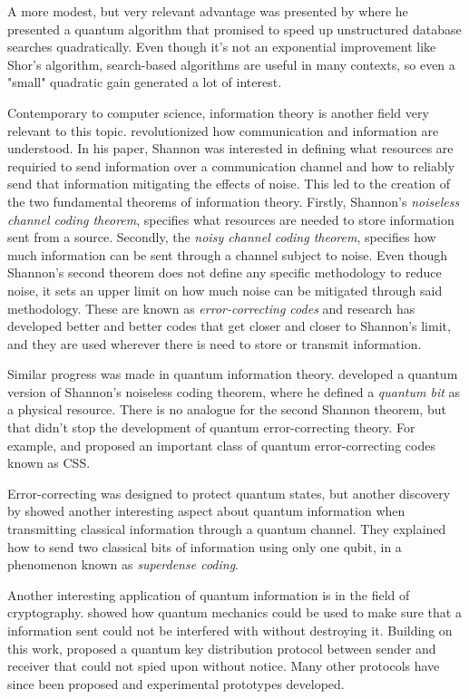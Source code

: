 \documentclass[../../dissertation.tex]{subfiles}
\begin{document}
A more modest, but very relevant advantage was presented by \cite{grover1996}
where he presented a quantum algorithm that promised to speed up unstructured
database searches quadratically. Even though it's not an exponential
improvement like Shor's algorithm, search-based algorithms are useful in many
contexts, so even a "small" quadratic gain generated a lot of interest.\par

Contemporary to computer science, information theory is another field very
relevant to this topic. \cite{shannon48} revolutionized how communication and
information are understood. In his paper, Shannon was interested in defining
what resources are requiried to send information over a communication channel
and how to reliably send that information mitigating the effects of noise. This
led to the creation of the two fundamental theorems of information theory.
Firstly, Shannon's \textit{noiseless channel coding theorem}, specifies what
resources are needed to store information sent from a source. Secondly, the
\textit{noisy channel coding theorem}, specifies how much information can be
sent through a channel subject to noise. Even though Shannon's second theorem
does not define any specific methodology to reduce noise, it sets an upper
limit on how much noise can be mitigated through said methodology. These are
known as \textit{error-correcting codes} and research has developed better and
better codes that get closer and closer to Shannon's limit, and they are used
wherever there is need to store or transmit information.\par 

Similar progress was made in quantum information theory. \cite{schumacher95}
developed a quantum version of Shannon's noiseless coding theorem, where he
defined a \textit{quantum bit} as a physical resource. There is no analogue for
the second Shannon theorem, but that didn't stop the development of quantum
error-correcting theory. For example, \cite{shorcalder96} and \cite{steane96}
proposed an important class of quantum error-correcting codes known as CSS.\par

Error-correcting was designed to protect quantum states, but another discovery
by \cite{wisnerbennet92} showed another interesting aspect about quantum
information when transmitting classical information through a quantum channel.
They explained how to send two classical bits of information using only one
qubit, in a phenomenon known as \textit{superdense coding}.\par Another
interesting application of quantum information is in the field of cryptography.
\cite{wisner60} showed how quantum mechanics could be used to make sure that a
information sent could not be interfered with without destroying it. Building
on this work, \cite{bennetbassard84} proposed a quantum key distribution
protocol between sender and receiver that could not spied upon without notice.
Many other protocols have since been proposed and experimental prototypes
developed.\par
\end{document}

